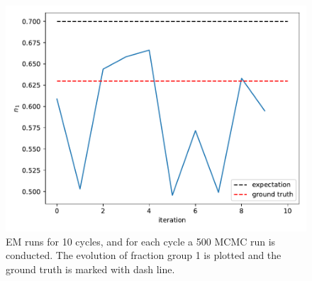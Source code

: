 \documentclass[11pt]{article}
\theoremstyle{definition}
\begin{document}
\begin{figure}[t]
    \begin{center}
    \includegraphics[width=0.8\columnwidth]{./q6_runs_small_pab.pdf}
    \caption{EM runs for 10 cycles, and for each cycle a 500 MCMC run is conducted. The evolution of fraction group 1 is plotted and the ground truth is marked with dash line.}
    \label{fig: q6_runs}
    \end{center}
\end{figure}
\end{document}
